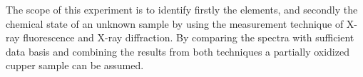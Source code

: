 
The scope of this experiment is to identify firstly the elements, and secondly the chemical state of an unknown sample by using the 
measurement technique of X-ray fluorescence and X-ray diffraction. By comparing the spectra with sufficient data basis and combining the results from both techniques a partially oxidized cupper sample can be assumed.